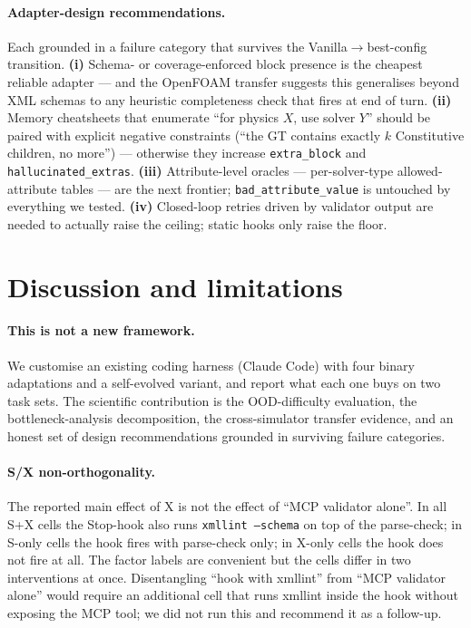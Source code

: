 \documentclass{article}
\begin{document}
\paragraph{Adapter-design recommendations.}
Each grounded in a failure category that survives the Vanilla$\to$best-config transition. \textbf{(i)} Schema- or coverage-enforced block presence is the cheapest reliable adapter --- and the OpenFOAM transfer suggests this generalises beyond XML schemas to any heuristic completeness check that fires at end of turn. \textbf{(ii)} Memory cheatsheets that enumerate ``for physics $X$, use solver $Y$'' should be paired with explicit negative constraints (``the GT contains exactly $k$ Constitutive children, no more'') --- otherwise they increase \texttt{extra\_block} and \texttt{hallucinated\_extras}. \textbf{(iii)} Attribute-level oracles --- per-solver-type allowed-attribute tables --- are the next frontier; \texttt{bad\_attribute\_value} is untouched by everything we tested. \textbf{(iv)} Closed-loop retries driven by validator output are needed to actually raise the ceiling; static hooks only raise the floor.


\section{Discussion and limitations}
\label{sec:discussion}
\label{subsec:limitations}

\paragraph{This is not a new framework.}
We customise an existing coding harness (Claude Code) with four binary adaptations and a self-evolved variant, and report what each one buys on two task sets. The scientific contribution is the OOD-difficulty evaluation, the bottleneck-analysis decomposition, the cross-simulator transfer evidence, and an honest set of design recommendations grounded in surviving failure categories.

\paragraph{S/X non-orthogonality.}
The reported main effect of $\mathrm{X}$ is not the effect of ``MCP validator alone''. In all S+X cells the Stop-hook also runs \texttt{xmllint --schema} on top of the parse-check; in S-only cells the hook fires with parse-check only; in X-only cells the hook does not fire at all. The factor labels are convenient but the cells differ in two interventions at once. Disentangling ``hook with xmllint'' from ``MCP validator alone'' would require an additional cell that runs xmllint inside the hook without exposing the MCP tool; we did not run this and recommend it as a follow-up.
\end{document}
